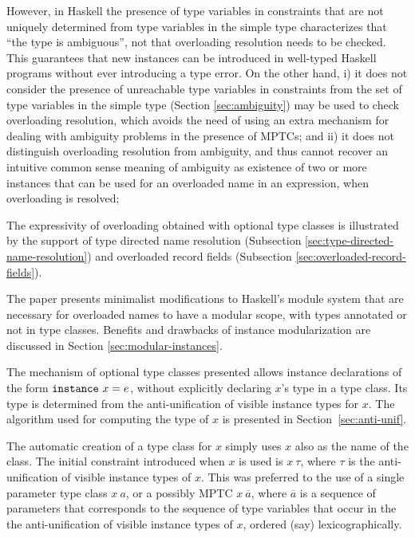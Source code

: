 However, in Haskell the presence of type variables in constraints that
are not uniquely determined from type variables in the simple type
characterizes that ``the type is ambiguous'', not that overloading
resolution needs to be checked.  This guarantees that new instances
can be introduced in well-typed Haskell programs without ever
introducing a type error. On the other hand, i) it does not consider
the presence of unreachable type variables in constraints from the set
of type variables in the simple type (Section \ref{sec:ambiguity}) may
be used to check overloading resolution, which avoids the need of
using an extra mechanism for dealing with ambiguity problems in the
presence of MPTCs; and ii) it does not distinguish overloading
resolution from ambiguity, and thus cannot recover an intuitive common
sense meaning of ambiguity as existence of two or more instances that
can be used for an overloaded name in an expression, when overloading
is resolved;

The expressivity of overloading obtained with optional type classes is
illustrated by the support of type directed name resolution
(Subsection \ref{sec:type-directed-name-resolution}) and overloaded
record fields (Subsection \ref{sec:overloaded-record-fields}).

The paper presents minimalist modifications to Haskell's module system
that are necessary for overloaded names to have a modular scope, with
types annotated or not in type classes. Benefits and drawbacks of
instance modularization are discussed in Section
\ref{sec:modular-instances}.

The mechanism of optional type classes presented allows instance
declarations of the form $\instance\ x=e$, without explicitly
declaring $x$'s type in a type class.  Its type is determined from the
anti-unification of visible instance types for $x$. The algorithm
used for computing the type of $x$ is presented in
Section~\ref{sec:anti-unif}.

The automatic creation of a type class for $x$ simply uses $x$ also as
the name of the class. The initial constraint introduced when $x$ is
used is $x\:\tau$, where $\tau$ is the anti-unification of visible
instance types of $x$. This was preferred to the use of a single
parameter type class $x\: a$, or a possibly MPTC $x\:\overline{a}$,
where $\overline{a}$ is a sequence of parameters that corresponds to
the sequence of type variables that occur in the the anti-unification
of visible instance types of $x$, ordered (say) lexicographically.

